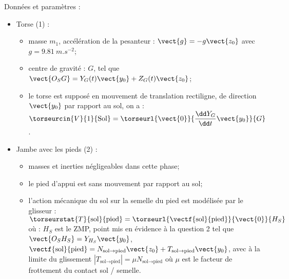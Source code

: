 Données et paramètres :
\begin{itemize}
\item Torse (1) :
\begin{itemize}
\item masse $m_1$, accélération de la pesanteur : $\vect{g}=-g\vect{z_0}$ avec
$g=\SI{9,81}{m.s^{-2}}$;
\item centre de gravité : $G$, tel que $\vect{O_SG}=Y_G(t)\vect{y_0}+Z_G(t)\vect{z_0}$;
\item le torse est supposé en mouvement de translation rectiligne, de direction $\vect{y_0}$ par rapport au sol, on a : $\torseurcin{V}{1}{\text{Sol}}=\torseurl{\vect{0}}{\dfrac{\dd Y_G}{\dd t}\vect{y_0}}{G}$.
\end{itemize}
\item Jambe avec les pieds (2) :
\begin{itemize}
\item masses et inerties négligeables dans cette phase;
\item le pied d'appui est sans mouvement par rapport au sol;
\item l'action mécanique du sol sur la semelle du pied est modélisée par le glisseur : $\torseurstat{T}{\text{sol}}{\text{pied}}=\torseurl{\vectf{\text{sol}}{\text{pied}}}{\vect{0}}{H_S}$
où : $H_S$ est le ZMP, point mis en évidence à la question 2 tel que $\vect{O_S H_S}=Y_{H_S}\vect{y_0}$, 
 $\vectf{\text{sol}}{\text{pied}}=N_{\text{sol}\rightarrow \text{pied}}\vect{z_0}+T_{\text{sol}\rightarrow \text{pied}}\vect{y_0}$, avec à la limite du glissement $\left| T_{\text{sol}\rightarrow \text{pied}}\right| = \mu N_{\text{sol}\rightarrow \text{pied}}$ où $\mu$ est le facteur de frottement du contact sol / semelle.
\end{itemize}
\end{itemize}

\fi

